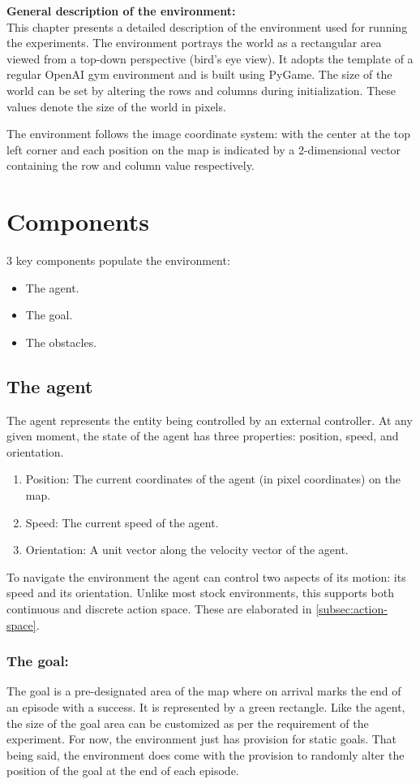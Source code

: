 \textbf{General description of the environment:}\\
This chapter presents a detailed description of the environment used for running the experiments. The environment portrays the world as a rectangular area viewed from a top-down perspective (bird's eye view). It adopts the template of a regular OpenAI gym environment and is built using PyGame.
The size of the world can be set by altering the rows and columns during initialization. These values denote the size of the world in pixels.

The environment follows the image coordinate system: with the center at the top left corner and each position on the map is indicated by a 2-dimensional vector containing the row and column value respectively.\\
\section{Components}
3 key components populate the environment: 
\begin{itemize}
    \item The agent.
    \item The goal.
    \item The obstacles.
\end{itemize}
\subsection{The agent}
The agent represents the entity being controlled by an external controller. At any given moment, the state of the agent has three properties: position, speed, and orientation.
\begin{enumerate}
    \item Position: The current coordinates of the agent (in pixel coordinates) on the map.
    \item Speed: The current speed of the agent.
    \item Orientation: A unit vector along the velocity vector of the agent.
\end{enumerate}
To navigate the environment the agent can control two aspects of its motion: its speed and its orientation.
Unlike most stock environments, this supports both continuous and discrete action space. These are elaborated in \autoref{subsec:action-space}.
\subsubsection{The goal:}
The goal is a pre-designated area of the map where on arrival marks the end of an episode with a success. It is represented by a green rectangle. Like the agent, the size of the goal area can be customized as per the requirement of the experiment. For now, the environment just has provision for static goals. That being said, the environment does come with the provision to randomly alter the position of the goal at the end of each episode.


